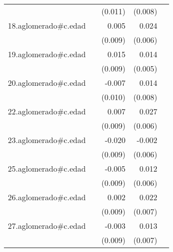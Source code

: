 {\begin{longtable}{l*{4}{D{.}{.}{-1}}}
            &                     &     (0.011)         &     (0.008)         &                     \\
\addlinespace
18.aglomerado#c.edad&                     &       0.005         &       0.024\sym{***}&                     \\
            &                     &     (0.009)         &     (0.006)         &                     \\
\addlinespace
19.aglomerado#c.edad&                     &       0.015         &       0.014\sym{**} &                     \\
            &                     &     (0.009)         &     (0.005)         &                     \\
\addlinespace
20.aglomerado#c.edad&                     &      -0.007         &       0.014         &                     \\
            &                     &     (0.010)         &     (0.008)         &                     \\
\addlinespace
22.aglomerado#c.edad&                     &       0.007         &       0.027\sym{***}&                     \\
            &                     &     (0.009)         &     (0.006)         &                     \\
\addlinespace
23.aglomerado#c.edad&                     &      -0.020\sym{*}  &      -0.002         &                     \\
            &                     &     (0.009)         &     (0.006)         &                     \\
\addlinespace
25.aglomerado#c.edad&                     &      -0.005         &       0.012         &                     \\
            &                     &     (0.009)         &     (0.006)         &                     \\
\addlinespace
26.aglomerado#c.edad&                     &       0.002         &       0.022\sym{**} &                     \\
            &                     &     (0.009)         &     (0.007)         &                     \\
\addlinespace
27.aglomerado#c.edad&                     &      -0.003         &       0.013         &                     \\
            &                     &     (0.009)         &     (0.007)         &                     \\

\end{longtable}}
